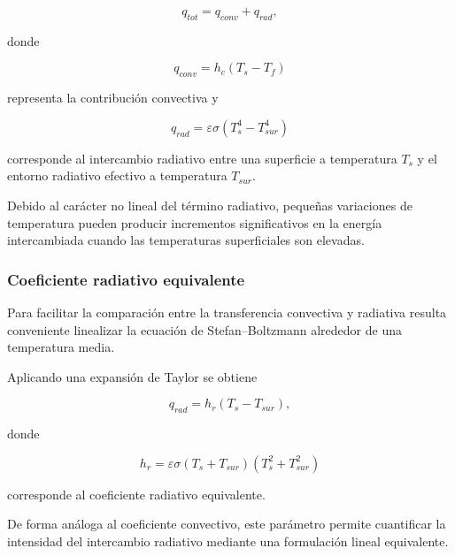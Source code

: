 \begin{equation}
q_{tot}=q_{conv}+q_{rad},
\label{eq:qtotal}
\end{equation}

donde

\begin{equation}
q_{conv}=h_c(T_s-T_f)
\end{equation}

representa la contribución convectiva y

\begin{equation}
q_{rad}=\varepsilon\sigma\left(T_s^4-T_{sur}^4\right)
\label{eq:qrad}
\end{equation}

corresponde al intercambio radiativo entre una superficie a temperatura $T_s$ y el entorno radiativo efectivo a temperatura $T_{sur}$.

Debido al carácter no lineal del término radiativo, pequeñas variaciones de temperatura pueden producir incrementos significativos en la energía intercambiada cuando las temperaturas superficiales son elevadas.


\subsubsection{Coeficiente radiativo equivalente}

Para facilitar la comparación entre la transferencia convectiva y radiativa resulta conveniente linealizar la ecuación de Stefan--Boltzmann alrededor de una temperatura media.

Aplicando una expansión de Taylor se obtiene

\begin{equation}
q_{rad}
=
h_r
(T_s-T_{sur}),
\end{equation}

donde

\begin{equation}
h_r=
\varepsilon\sigma
(T_s+T_{sur})
(T_s^2+T_{sur}^2)
\label{eq:hr}
\end{equation}

corresponde al coeficiente radiativo equivalente.

De forma análoga al coeficiente convectivo, este parámetro permite cuantificar la intensidad del intercambio radiativo mediante una formulación lineal equivalente.


